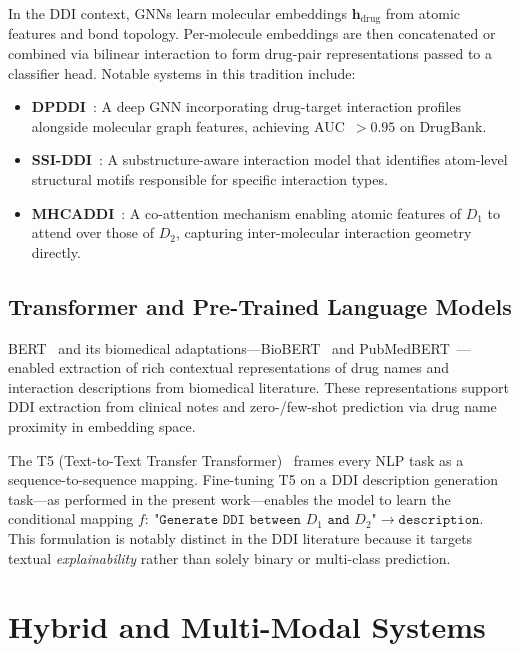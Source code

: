 \documentclass[12pt,a4paper,oneside]{report}
\begin{document}
In the DDI context, GNNs learn molecular embeddings $\mathbf{h}_{\mathrm{drug}}$ from atomic
features and bond topology. Per-molecule embeddings are then concatenated or combined via
bilinear interaction to form drug-pair representations passed to a classifier head. Notable
systems in this tradition include:

\begin{itemize}
  \item \textbf{DPDDI}~\cite{feng2020dpddi}: A deep GNN incorporating drug-target interaction
  profiles alongside molecular graph features, achieving AUC~$> 0.95$ on DrugBank.
  \item \textbf{SSI-DDI}~\cite{jaeger2021hyper}: A substructure-aware interaction model that
  identifies atom-level structural motifs responsible for specific interaction types.
  \item \textbf{MHCADDI}~\cite{deac2019drug}: A co-attention mechanism enabling atomic
  features of $D_1$ to attend over those of $D_2$, capturing inter-molecular interaction
  geometry directly.
\end{itemize}

\subsection{Transformer and Pre-Trained Language Models}

BERT~\cite{devlin2018bert} and its biomedical adaptations---BioBERT~\cite{lee2020biobert}
and PubMedBERT~\cite{gu2021domain}---enabled extraction of rich contextual representations
of drug names and interaction descriptions from biomedical literature. These representations
support DDI extraction from clinical notes and zero-/few-shot prediction via drug name
proximity in embedding space.

The T5 (Text-to-Text Transfer Transformer)~\cite{raffel2020exploring} frames every NLP task
as a sequence-to-sequence mapping. Fine-tuning T5 on a DDI description generation
task---as performed in the present work---enables the model to learn the conditional mapping
$f{:}\ \texttt{"Generate DDI between } D_1 \texttt{ and } D_2\texttt{"} \to
\texttt{description}$. This formulation is notably distinct in the DDI literature because
it targets textual \textit{explainability} rather than solely binary or multi-class
prediction.

\section{Hybrid and Multi-Modal Systems}
\end{document}
